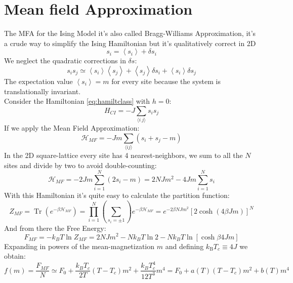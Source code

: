 \documentclass[12pt,a4paper]{article}
\begin{document}
\appendix
\section{Mean field Approximation}\label{MFA}
The MFA for the Ising Model it's also called Bragg-Williams Approximation, it's a crude way to simplify the Ising Hamiltonian but it's qualitatively correct in 2D
\begin{equation}
	s_i =  \left\langle s_{i}\right\rangle +\delta s_i 
\end{equation} 
We neglect the quadratic corrections in $\delta s$:
\begin{equation}
	s_{i} s_{j} \simeq \left\langle s_{i}\right\rangle\left\langle s_{j}\right\rangle+\left\langle s_{j}\right\rangle \delta s_{i}+\left\langle s_{i}\right\rangle \delta s_{j}
\end{equation}
The expectation value $\left\langle s_{i}\right\rangle=m$ for every site because the system is translationally invariant.\\
Consider the Hamiltonian \ref{eq:hamiltclass} with $h=0$:
\begin{equation}
	H_{CI}=-J\sum _{\langle i~j\rangle }s _{i}s _{j}
\end{equation}
If we apply the Mean Field Approximation:
\begin{equation}
	\mathcal{H}_{MF}=-J m \sum_{\langle i j\rangle}\left(s_{i}+s_{j}-m\right)
\end{equation}
In the 2D square-lattice every site has 4 nearest-neighbors, we sum to all the $N$ sites and  divide by two to avoid double-counting:
\begin{equation}
	\mathcal{H}_{MF}=-2 J m \sum_{i=1}^{N}\left(2 s_{i}-m\right) =2N J m^{2}-4 J m \sum_{i=1}^{N} s_i
\end{equation}  
With this Hamiltonian it's quite easy to calculate the partition function:
\begin{equation}
	Z_{MF} =\operatorname{Tr}\left(e^{-\beta \mathcal{H}_{MF}}\right) 
	=\prod_{i=1}^{N}\left(\sum_{s_{i}=\pm 1}\right) e^{-\beta \mathcal{H}_{MF}}=e^{-2 \beta N  J m^{2}}\left[2 \cosh \left(4 \beta Jm\right)\right]^{N}
\end{equation}
And from there the Free Energy:
\begin{equation}
	F_{MF}=-k_B T\ln Z_{MF}=2 N  J m^{2}-N k_B T\ln 2-N k_B T \ln \left[ \cosh \beta  4Jm \right]
\end{equation}
Expanding in powers of the mean-magnetization $m$ and defining $k_{\mathrm{B}} T_{c} \equiv 4 J$ we obtain:
\begin{equation}
	f(m)=\frac{F_{MF}}{N} \simeq F_{0}+\frac{k_BT_c}{2T}\left(T-T_{c}\right) m^{2}+\frac{k_BT_c^4}{12T^3} m^{4}= F_{0}+a(T)\left(T-T_{c}\right) m^{2}+b(T) m^{4}
\end{equation}


\end{document}
